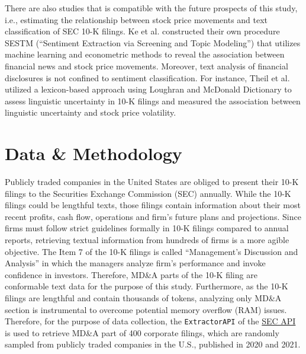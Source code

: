 \documentclass{article}
\begin{document}
\noindent There are also studies that is compatible with the future prospects of this study, i.e., estimating the relationship between stock price movements and text classification of SEC 10-K filings. Ke et al. constructed their own procedure SESTM (``Sentiment Extraction via Screening and Topic Modeling'') that utilizes machine learning and econometric methods to reveal the association between financial news and stock price movements. \cite{ke2019predicting} Moreover, text analysis of financial disclosures is not confined to sentiment classification. For instance, Theil et al. utilized a lexicon-based approach using Loughran and McDonald Dictionary to assess linguistic uncertainty in 10-K filings and measured the association between linguistic uncertainty and stock price volatility. \cite{theil2018word} \\

\section{Data \& Methodology}

Publicly traded companies in the United States are obliged to present their 10-K filings to the Securities Exchange Commission (SEC) annually. While the 10-K filings could be lengthful texts, those filings contain information about their most recent profits, cash flow, operations and firm's future plans and projections. Since firms must follow strict guidelines formally in 10-K filings compared to annual reports, retrieving textual information from hundreds of firms is a more agible objective. The Item 7 of the 10-K filings is called ``Management's Discussion and Analysis'' in which the managers analyze firm's performance and invoke confidence in investors. Therefore, MD\&A parts of the 10-K filing are conformable text data for the purpose of this study. Furthermore, as the 10-K filings are lengthful and contain thousands of tokens, analyzing only MD\&A section is instrumental to overcome potential memory overflow (RAM) issues. Therefore, for the purpose of data collection, the \texttt{ExtractorAPI} of the \href{https://sec-api.io/}{SEC API} is used to retrieve MD\&A part of 400 corporate filings, which are randomly sampled from publicly traded companies in the U.S., published in 2020 and 2021. \\
\end{document}
